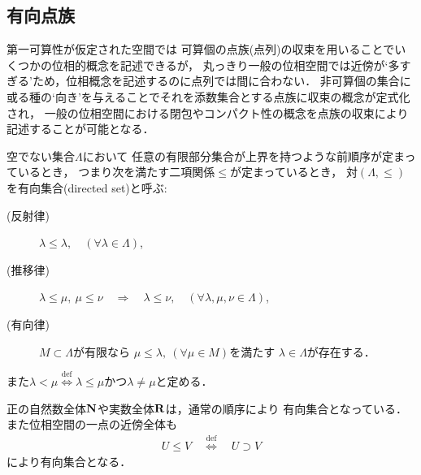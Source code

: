 \subsection{有向点族}
	第一可算性が仮定された空間では
	可算個の点族(点列)の収束を用いることでいくつかの位相的概念を記述できるが，
	丸っきり一般の位相空間では近傍が`多すぎる'ため，位相概念を記述するのに点列では間に合わない．
	非可算個の集合に或る種の`向き'を与えることでそれを添数集合とする点族に収束の概念が定式化され，
	一般の位相空間における閉包やコンパクト性の概念を点族の収束により記述することが可能となる．
	
	\begin{screen}
		\begin{dfn}[有向集合]
			空でない集合$\Lambda$において
			任意の有限部分集合が上界を持つような前順序が定まっているとき，
			つまり次を満たす二項関係$\leq$が定まっているとき，
			対$(\Lambda,\leq)$を有向集合(directed set)と呼ぶ:
			\begin{description}
				\item[(反射律)] $\lambda \leq \lambda,\quad (\forall \lambda \in \Lambda)$,
				\item[(推移律)] $\lambda \leq \mu,\ \mu \leq \nu 
					\quad \Longrightarrow \quad \lambda \leq \nu,\quad 
					(\forall \lambda,\mu,\nu \in \Lambda)$,
				\item[(有向律)] 
					$M \subset \Lambda$が有限なら
					$\mu \leq \lambda,\ (\forall \mu \in M)$を満たす
					$\lambda \in \Lambda$が存在する．
			\end{description}
			また$\lambda < \mu \overset{\mathrm{def}}{\Longleftrightarrow} 
			\mbox{$\lambda \leq \mu$かつ$\lambda \neq \mu$}$と定める．
		\end{dfn}
	\end{screen}
	正の自然数全体$\mathbf{N}$や実数全体$\mathbf{R}$は，通常の順序により
	有向集合となっている．また位相空間の一点の近傍全体も
	\begin{align}
		U \leq V \quad \overset{\mathrm{def}}{\Longleftrightarrow} \quad
		U \supset V
	\end{align}
	により有向集合となる．
	
